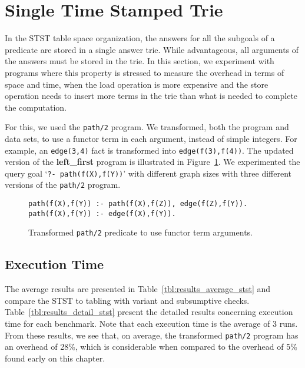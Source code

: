 


\section{Single Time Stamped Trie}

In the STST table space organization, the answers for all the subgoals
of a predicate are stored in a single answer trie. While advantageous, all arguments of
the answers must be stored in the trie. In this section, we experiment with programs
where this property is stressed to measure the overhead in terms of space and time, when
the load operation is more expensive and the store operation needs to insert more terms in
the trie than what is needed to complete the computation.

For this, we used the \texttt{path/2} program. We transformed, both the program and data sets,
to use a functor term in each argument, instead of simple integers. For example, an
\texttt{edge(3,4)} fact is transformed into \texttt{edge(f(3),f(4))}. The updated version
of the \textbf{left\_first} program is illustrated in Figure~\ref{fig:converted_path}.
We experimented the query goal `\texttt{?-~path(f(X),f(Y))}' with different graph sizes with
three different versions of the \texttt{path/2} program.

\begin{figure}[ht]
\begin{Verbatim}
path(f(X),f(Y)) :- path(f(X),f(Z)), edge(f(Z),f(Y)).
path(f(X),f(Y)) :- edge(f(X),f(Y)).
\end{Verbatim}
\caption{Transformed \texttt{path/2} predicate to use functor term arguments.}
\label{fig:converted_path}
\end{figure}

\subsection{Execution Time}

The average results are presented in Table~\ref{tbl:results_average_stst} and compare the STST to
tabling with variant and subsumptive checks. Table~\ref{tbl:results_detail_stst} present the detailed
results concerning execution time for each benchmark. Note that each execution time is the average
of 3 runs. From these results, we see that, on average, the transformed \texttt{path/2} program has an
overhead of 28\%, which is considerable when compared to the overhead of 5\% found early on this chapter.

